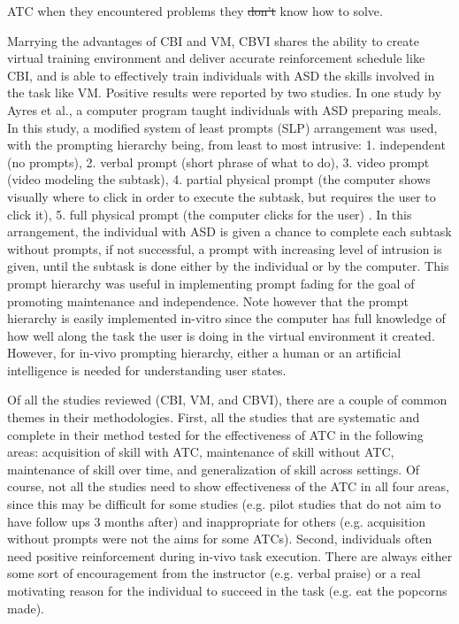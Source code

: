 \documentclass{ut-thesis}
\providecommand{\DIFaddtex}[1]{{\protect\color{blue}\uwave{#1}}} %
\providecommand{\DIFdeltex}[1]{{\protect\color{red}\sout{#1}}}                      %
\providecommand{\DIFaddbegin}{} %
\providecommand{\DIFaddend}{} %
\providecommand{\DIFdelbegin}{} %
\providecommand{\DIFdelend}{} %
\providecommand{\DIFadd}[1]{\texorpdfstring{\DIFaddtex{#1}}{#1}} %
\providecommand{\DIFdel}[1]{\texorpdfstring{\DIFdeltex{#1}}{}} %
\begin{document}
ATC when they encountered problems they \DIFdelbegin \DIFdel{don't }\DIFdelend \DIFaddbegin \DIFadd{do not }\DIFaddend know how to solve.

Marrying the advantages of CBI and VM, CBVI shares the ability to create virtual training environment and deliver accurate reinforcement schedule like CBI, and is able to effectively train individuals with ASD the skills involved in the task like VM.  Positive results were reported by two studies.  In one study by Ayres et al., a computer program taught individuals with ASD preparing meals.  In this study, a modified system of least prompts (SLP) arrangement was used, with the prompting hierarchy being, from least to most intrusive: 1. independent (no prompts), 2. verbal prompt (short phrase of what to do), 3. video prompt (video modeling the subtask), 4. partial physical prompt (the computer shows visually where to click in order to execute the subtask, but requires the user to click it), 5. full physical prompt (the computer clicks for the user) \cite{ayres2009acquisition}.  In this arrangement, the individual with ASD is given a chance to complete each subtask without prompts, if not successful, a prompt with increasing level of intrusion is given, until the subtask is done either by the individual or by the computer.  This prompt hierarchy was useful in implementing prompt fading for the goal of promoting maintenance and independence.  Note however that the prompt hierarchy is easily implemented in-vitro since the computer has full knowledge of how well along the task the user is doing in the virtual environment it created.  However, for in-vivo prompting hierarchy, either a human or an artificial intelligence is needed for understanding user states.

Of all the studies reviewed (CBI, VM, and CBVI), there are a couple of common themes in their methodologies.  First, all the studies that are systematic and complete in their method tested for the effectiveness of ATC in the following areas: acquisition of skill with ATC, maintenance of skill without ATC, maintenance of skill over time, and generalization of skill across settings.  Of course, not all the studies need to show effectiveness of the ATC in all four areas, since this may be difficult for some studies (e.g. pilot studies that do not aim to have follow ups 3 months after) and inappropriate for others (e.g. acquisition without prompts were not the aims for some ATCs).  Second, individuals often need positive reinforcement during in-vivo task execution.  There are always either some sort of encouragement from the instructor (e.g. verbal praise) or a real motivating reason for the individual to succeed in the task (e.g. eat the popcorns made).
\end{document}
